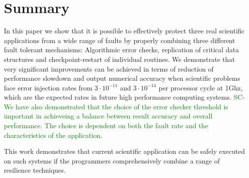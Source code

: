 \documentclass{sig-alternate}
\newcommand{\sui}[1]{%
  \textcolor{green}{SC-#1}
}
\begin{document}


\section{Summary}
\label{sec:summary}

In this paper we show that it is possible to effectively protect three real scientific applications from a wide range of faults by properly combining three different fault tolerant mechanisms:
Algorithmic error checks, replication of critical data structures and checkpoint-restart of individual routines.
We demonstrate that very significant improvements can be achieved in terms of reduction of performance slowdown and output numerical accuracy when scientific problems face error injection rates from $3 \cdot 10^{-11}$ and $3 \cdot 10^{-14}$ per processor cycle at 1Ghz, which are the expected rates in future high performance computing systems.
\sui{We have also demonstrated that the choice of the error checker threshold is important in achieveing a balance between result accuracy and overall performance. The choice is dependent on both the fault rate and the characteristics of the application.}
This work demonstrates that current scientific application can be safely executed on such systems if the programmers comprehensively combine a range of resilience techniques.



\end{document}
